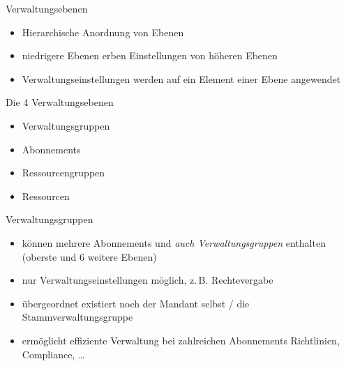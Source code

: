 
\begin{flashcard}[Definition]{Verwaltungsebenen}
  \begin{itemize}
    \item Hierarchische Anordnung von Ebenen
    \item niedrigere Ebenen erben Einstellungen von höheren Ebenen
    \item Verwaltungseinstellungen werden auf ein Element einer Ebene angewendet
  \end{itemize}
\end{flashcard}

\begin{flashcard}[Definition]{Die 4 Verwaltungsebenen}
  \begin{itemize}
    \item Verwaltungsgruppen
    \item Abonnements
    \item Ressourcengruppen
    \item Ressourcen
  \end{itemize}
\end{flashcard}

\begin{flashcard}[Definition]{Verwaltungsgruppen}
  \begin{itemize}
    \item können mehrere Abonnements und \emph{auch Verwaltungsgruppen} enthalten\newline
      (oberste und 6 weitere Ebenen)
    \item nur Verwaltungseinstellungen möglich, z.\,B. Rechtevergabe
    \item übergeordnet existiert noch der Mandant selbst / die Stammverwaltungsgruppe
    \item ermöglicht effiziente Verwaltung bei zahlreichen Abonnements\newline
      Richtlinien, Compliance, \ldots
  \end{itemize}
\end{flashcard}

